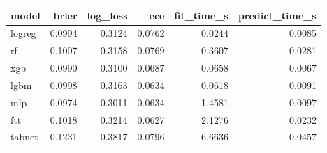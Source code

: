 \begin{tabular}{lrrrrr}
\toprule
model & brier & log\_loss & ece & fit\_time\_s & predict\_time\_s \\
\midrule
logreg & 0.0994 & 0.3124 & 0.0762 & 0.0244 & 0.0085 \\
rf & 0.1007 & 0.3158 & 0.0769 & 0.3607 & 0.0281 \\
xgb & 0.0990 & 0.3100 & 0.0687 & 0.0658 & 0.0067 \\
lgbm & 0.0998 & 0.3163 & 0.0634 & 0.0618 & 0.0091 \\
mlp & 0.0974 & 0.3011 & 0.0634 & 1.4581 & 0.0097 \\
ftt & 0.1018 & 0.3214 & 0.0627 & 2.1276 & 0.0232 \\
tabnet & 0.1231 & 0.3817 & 0.0796 & 6.6636 & 0.0457 \\
\bottomrule
\end{tabular}
